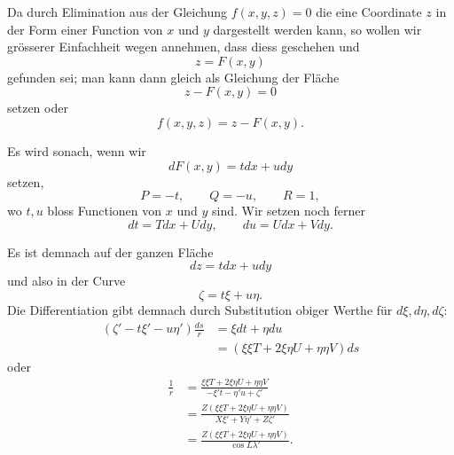 \par{}%
\noindent\hspace*{1.2em}Da durch Elimination aus der Gleichung $f(x,y,z)=0$ die eine Coordinate $z$ in der Form einer Function von $x$ und $y$ dargestellt werden kann, so wollen wir grösserer Einfachheit wegen annehmen, dass diess geschehen und
\[
z=F(x,y)
\]
gefunden sei; man kann dann gleich als Gleichung der Fläche
\[
z-F(x,y)=0
\]
setzen oder
\[
f(x,y,z)=z-F(x,y).
\]

Es wird sonach, wenn wir
\[
dF(x,y)=tdx+udy
\]
setzen,
\[
P=-t,\qquad Q=-u,\qquad R=1,
\]
wo $t,u$ bloss Functionen von $x$ und $y$ sind. Wir setzen noch ferner
\[
dt=Tdx+Udy,\qquad du=Udx+Vdy.
\]

Es ist demnach auf der ganzen Fläche
\[
dz=tdx+udy
\]
und also in der Curve
\[
\zeta=t\xi+u\eta.
\]
Die Differentiation gibt demnach durch Substitution obiger Werthe für $d\xi,d\eta,d\zeta$:
\[
\begin{aligned}
(\zeta'-t\xi'-u\eta')\frac{ds}{r}&=\xi dt+\eta du\\
&=(\xi\xi T+2\xi\eta U+\eta\eta V)ds
\end{aligned}
\]
oder
\[
\begin{aligned}
\frac1r&=\frac{\xi\xi T+2\xi\eta U+\eta\eta V}{-\xi't-\eta'u+\zeta'}\\
&=\frac{Z(\xi\xi T+2\xi\eta U+\eta\eta V)}{X\xi'+Y\eta'+Z\zeta'}\\
&=\frac{Z(\xi\xi T+2\xi\eta U+\eta\eta V)}{\cos L\lambda'}.
\end{aligned}
\]
